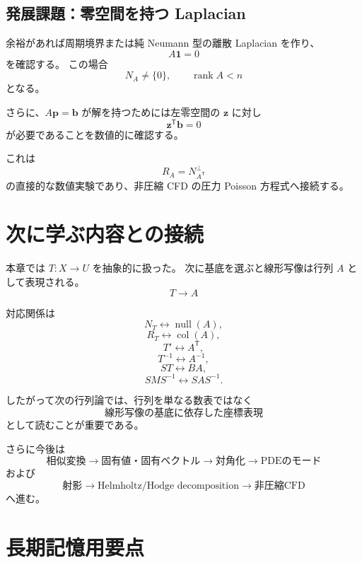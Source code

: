 \documentclass[a4paper,11pt]{ltjsarticle}
\newcommand{\rank}{\operatorname{rank}}
\begin{document}
\subsection{発展課題：零空間を持つ Laplacian}
余裕があれば周期境界または純 Neumann 型の離散 Laplacian を作り、
\[
A\bm 1=0
\]
を確認する。
この場合
\[
N_A\ne\{0\},\qquad \rank A<n
\]
となる。

さらに、$A\bm p=\bm b$ が解を持つためには左零空間の $\bm z$ に対し
\[
\bm z^{\mathsf T}\bm b=0
\]
が必要であることを数値的に確認する。

これは
\[
\boxed{R_A=N_{A^{\mathsf T}}^\perp}
\]
の直接的な数値実験であり、非圧縮 CFD の圧力 Poisson 方程式へ接続する。

\section{次に学ぶ内容との接続}

本章では $T:X\to U$ を抽象的に扱った。
次に基底を選ぶと線形写像は行列 $A$ として表現される。
\[
\boxed{T\longrightarrow A}
\]

対応関係は
\[
N_T\longleftrightarrow \operatorname{null}(A),
\]
\[
R_T\longleftrightarrow \operatorname{col}(A),
\]
\[
T'\longleftrightarrow A^{\mathsf T},
\]
\[
T^{-1}\longleftrightarrow A^{-1},
\]
\[
ST\longleftrightarrow BA,
\]
\[
SMS^{-1}\longleftrightarrow SAS^{-1}.
\]

したがって次の行列論では、行列を単なる数表ではなく
\[
\boxed{\text{線形写像の基底に依存した座標表現}}
\]
として読むことが重要である。

さらに今後は
\[
\text{相似変換}
\to
\text{固有値・固有ベクトル}
\to
\text{対角化}
\to
\text{PDEのモード}
\]
および
\[
\text{射影}
\to
\text{Helmholtz/Hodge decomposition}
\to
\text{非圧縮CFD}
\]
へ進む。

\section{長期記憶用要点}
\end{document}
